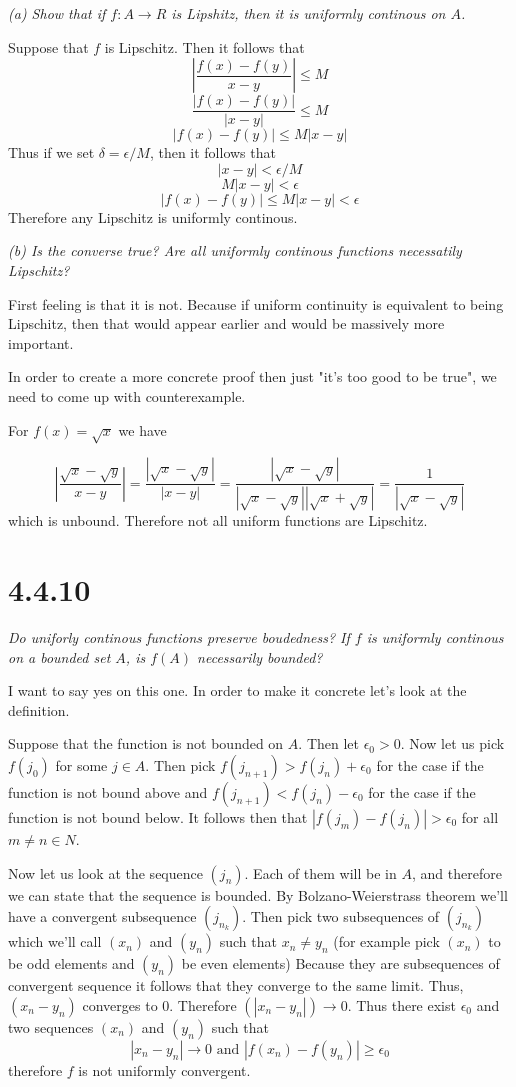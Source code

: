 \documentclass[11pt,oneside,titlepage]{book}
\begin{document}
\textit{(a) Show that if $f: A \to R$ is Lipshitz, then it is uniformly
  continous on $A$. }

Suppose that $f$ is Lipschitz. Then it follows that
$$\left|\frac{f(x) - f(y)}{x - y}\right| \leq M$$
$$\frac{|f(x) - f(y)|}{|x - y|} \leq M$$
$$|f(x) - f(y)| \leq M|x - y|$$
Thus if we set $\delta = \epsilon/M$, then it follows that
$$|x - y| < \epsilon/M$$
$$M|x - y| < \epsilon$$
$$|f(x) - f(y)| \leq M|x - y| < \epsilon$$
Therefore any Lipschitz is uniformly continous.

\textit{(b) Is the converse true? Are all uniformly continous functions
  necessatily Lipschitz?}

First feeling is that it is not. Because if uniform continuity is equivalent
to being Lipschitz, then that would appear earlier and would be massively more
important.

In order to create a more concrete proof then just
"it's too good to be true", we need to come up with counterexample.

For $f(x) = \sqrt{x}$ we have 

$$\left|\frac{\sqrt{x} - \sqrt{y}}{x - y}\right| =
\frac{|\sqrt{x} - \sqrt{y}|}{|x - y|} =
\frac{|\sqrt{x} - \sqrt{y}|}{|\sqrt{x} - \sqrt{y}||\sqrt{x} + \sqrt{y}|} =
\frac{1}{|\sqrt{x} - \sqrt{y}|}$$
which is unbound. Therefore not all uniform functions are Lipschitz.

\section*{4.4.10}
\textit{Do uniforly continous functions preserve boudedness? If $f$ is
  uniformly continous on a bounded set $A$, is $f(A)$ necessarily bounded?}

I want to say yes on this one. In order to make it concrete let's look at
the definition.

Suppose that the function is not bounded on $A$. Then
let $\epsilon_0 > 0$. 
Now let us pick $f(j_0)$ for some $j \in A$.
Then pick $f(j_{n + 1}) > f(j_n) + \epsilon_0$ for the case if the function is
not bound above and $f(j_{n + 1}) < f(j_n) - \epsilon_0$ for the case if the
function is not bound below. It follows then
that $|f(j_{m}) - f(j_n)| > \epsilon_0$ for all $m \neq n \in N$.

Now let us look at the sequence $(j_n)$. Each of them will be in $A$, and
therefore we can state that the sequence is bounded.
By Bolzano-Weierstrass theorem we'll have a convergent 
subsequence $(j_{n_k})$. Then pick two subsequences of $(j_{n_k})$ which
we'll call $(x_n)$ and $(y_n)$ such that $x_n \neq y_n$ (for example pick
$(x_n)$ to be odd elements and $(y_n)$ be even elements)
Because they are subsequences of convergent
sequence it follows that they converge to the same limit. Thus,
$(x_n - y_n)$ converges to 0. Therefore $(|x_n - y_n|) \to 0$. Thus there
exist $\epsilon_0$ and  two sequences $(x_n)$ and $(y_n)$ such that
$$|x_n - y_n| \to 0 \text{ and } |f(x_n) - f(y_n)| \geq \epsilon_0$$
therefore $f$ is not uniformly convergent.
\end{document}
